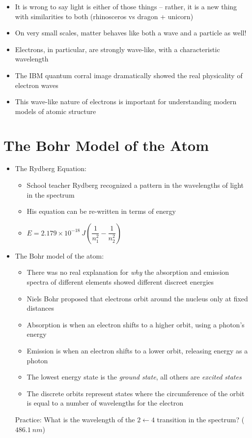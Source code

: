 \documentclass[12pt, openany, letterpaper]{memoir}
\begin{document}
\begin{itemize}
\begin{itemize}
		      \item It is wrong to say light is either of those things -- rather, it is a new thing with similarities to both (rhinosceros vs dragon + unicorn)
		      \item On very small scales, matter behaves like both a wave and a particle as well!
		      \item Electrons, in particular, are strongly wave-like, with a characteristic wavelength
		      \item The IBM quantum corral image dramatically showed the real physicality of electron waves
		      \item This wave-like nature of electrons is important for understanding modern models of atomic structure
	      \end{itemize}
\end{itemize}
\section{The Bohr Model of the Atom}
\begin{itemize}
	\item The Rydberg Equation:
	      \begin{itemize}
		      \item School teacher Rydberg recognized a pattern in the wavelengths of light in the  spectrum
		      \item His equation can be re-written in terms of energy
		      \item $E=2.179\times10^{-18}~J\left(\dfrac{1}{n_1^2}-\dfrac{1}{n_2^2}\right)$
	      \end{itemize}
	\item The Bohr model of the atom:
	      \begin{itemize}
		      \item There was no real explanation for \emph{why} the absorption and emission spectra of different elements showed different discreet energies
		      \item Niels Bohr proposed that electrons orbit around the nucleus only at fixed distances
		      \item Absorption is when an electron shifts to a higher orbit, using a photon's energy
		      \item Emission is when an electron shifts to a lower orbit, releasing energy as a photon
		      \item The lowest energy state is the \emph{ground state}, all others are \emph{excited states}
		      \item The discrete orbits represent states where the circumference of the orbit is equal to a number of wavelengths for the electron
	      \end{itemize}
	      Practice: What is the wavelength of the $2\leftarrow4$ transition in the  spectrum? ($486.1~nm$)
\end{itemize}
\end{document}
